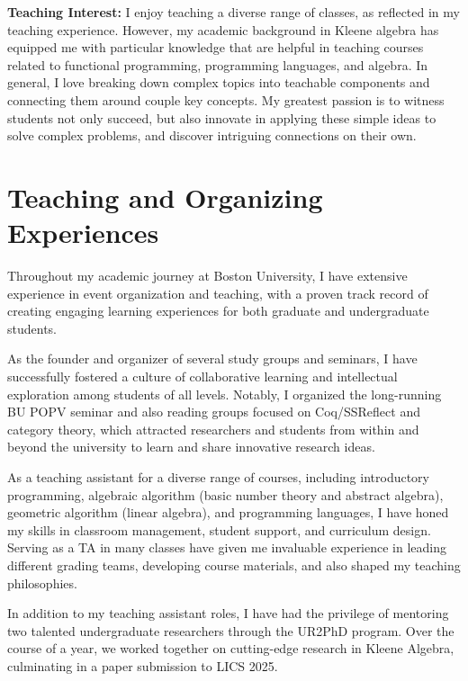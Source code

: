 \documentclass[11pt,a4paper,sans]{moderncv} %
\begin{document}
\textbf{Teaching Interest:}
I enjoy teaching a diverse range of classes, as reflected in my teaching experience. 
However, my academic background in Kleene algebra has equipped me with particular knowledge that are helpful in teaching courses related to functional programming, programming languages, and algebra. 
In general, I love breaking down complex topics into teachable components and connecting them around couple key concepts.
My greatest passion is to witness students not only succeed, but also innovate in applying these simple ideas to solve complex problems, and discover intriguing connections on their own.

\newpage %
\section{Teaching and Organizing Experiences}

Throughout my academic journey at Boston University, I have extensive experience in event organization and teaching, with a proven track record of creating engaging learning experiences for both graduate and undergraduate students.

As the founder and organizer of several study groups and seminars, I have successfully fostered a culture of collaborative learning and intellectual exploration among students of all levels. 
Notably, I organized the long-running BU POPV seminar and also reading groups focused on Coq/SSReflect and category theory, which attracted researchers and students from within and beyond the university to learn and share innovative research ideas.

As a teaching assistant for a diverse range of courses, including introductory programming, algebraic algorithm (basic number theory and abstract algebra), geometric algorithm (linear algebra), and programming languages, I have honed my skills in classroom management, student support, and curriculum design. 
Serving as a TA in many classes have given me invaluable experience in leading different grading teams, developing course materials, and also shaped my teaching philosophies.

In addition to my teaching assistant roles, I have had the privilege of mentoring two talented undergraduate researchers through the UR2PhD program. 
Over the course of a year, we worked together on cutting-edge research in Kleene Algebra, culminating in a paper submission to LICS 2025.
\end{document}
